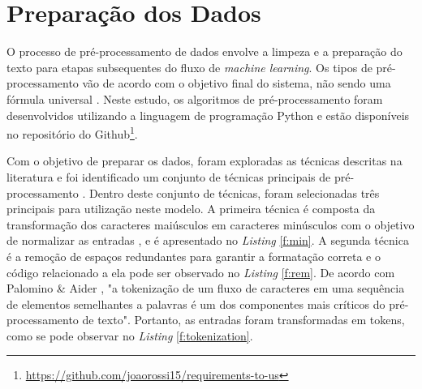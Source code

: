 \section{Preparação dos Dados}

O processo de pré-processamento de dados envolve a limpeza e a preparação do texto para etapas subsequentes do fluxo de \emph{machine learning}. Os tipos de pré-processamento vão de acordo com o objetivo final do sistema, não sendo uma fórmula universal \cite{haddi}. Neste estudo, os algoritmos de pré-processamento foram desenvolvidos utilizando a linguagem de programação Python e estão disponíveis no repositório do Github\footnote{\href{https://github.com/joaorossi15/requirements-to-us}{https://github.com/joaorossi15/requirements-to-us}}. 

Com o objetivo de preparar os dados, foram exploradas as técnicas descritas na literatura e foi identificado um conjunto de técnicas principais de pré-processamento \cite{pre-processing, angiani}. Dentro deste conjunto de técnicas, foram selecionadas três principais para utilização neste modelo. A primeira técnica é composta da transformação dos caracteres maiúsculos em caracteres minúsculos com o objetivo de normalizar as entradas \cite{angiani}, e é apresentado no \emph{Listing} \ref{f:min}. A segunda técnica é a remoção de espaços redundantes para garantir a formatação correta \cite{angiani} e o código relacionado a ela pode ser observado no \emph{Listing} \ref{f:rem}. De acordo com Palomino \& Aider \cite{pre-processing}, "a tokenização de um fluxo de caracteres em uma sequência de elementos semelhantes a palavras é um dos componentes mais críticos do pré-processamento de texto". Portanto, as entradas foram transformadas em tokens, como se pode observar no \emph{Listing} \ref{f:tokenization}.

